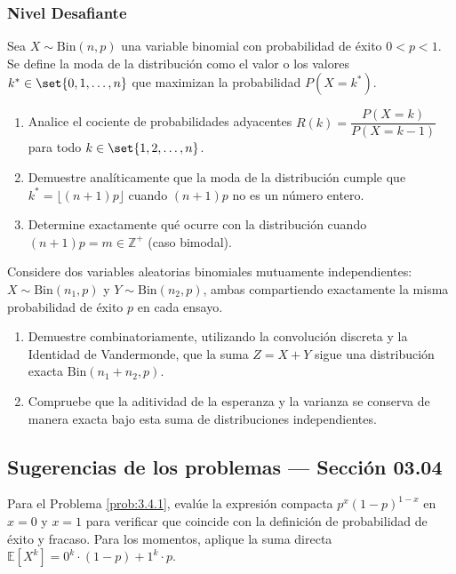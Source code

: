 \subsubsection*{Nivel Desafiante}

\begin{problema}
	\label{prob:3.4.9}
	Sea $X \sim \text{Bin}(n, p)$ una variable binomial con probabilidad de éxito $0 < p < 1$. Se define la moda de la distribución como el valor o los valores $k^* \in \set{0, 1, \dots, n}$ que maximizan la probabilidad $P(X = k^*)$.
	\begin{enumerate}
		\item Analice el cociente de probabilidades adyacentes $R(k) = \dfrac{P(X = k)}{P(X = k-1)}$ para todo $k \in \set{1, 2, \dots, n}$.
		\item Demuestre analíticamente que la moda de la distribución cumple que $k^* = \lfloor (n+1)p \rfloor$ cuando $(n+1)p$ no es un número entero.
		\item Determine exactamente qué ocurre con la distribución cuando $(n+1)p = m \in \mathbb{Z}^+$ (caso bimodal).
	\end{enumerate}
\end{problema}

\begin{problema}
	\label{prob:3.4.10}
	Considere dos variables aleatorias binomiales mutuamente independientes: $X \sim \text{Bin}(n_1, p)$ y $Y \sim \text{Bin}(n_2, p)$, ambas compartiendo exactamente la misma probabilidad de éxito $p$ en cada ensayo.
	\begin{enumerate}
		\item Demuestre combinatoriamente, utilizando la convolución discreta y la Identidad de Vandermonde, que la suma $Z = X + Y$ sigue una distribución exacta $\text{Bin}(n_1 + n_2, p)$.
		\item Compruebe que la aditividad de la esperanza y la varianza se conserva de manera exacta bajo esta suma de distribuciones independientes.
	\end{enumerate}
\end{problema}

\subsection*{Sugerencias de los problemas --- Sección 03.04}

\begin{sugerencia}
	\label{sug:3.4.1}
	Para el Problema \ref{prob:3.4.1}, evalúe la expresión compacta $p^x(1-p)^{1-x}$ en $x=0$ y $x=1$ para verificar que coincide con la definición de probabilidad de éxito y fracaso. Para los momentos, aplique la suma directa $\mathbb{E}[X^k] = 0^k \cdot (1-p) + 1^k \cdot p$.
\end{sugerencia}

